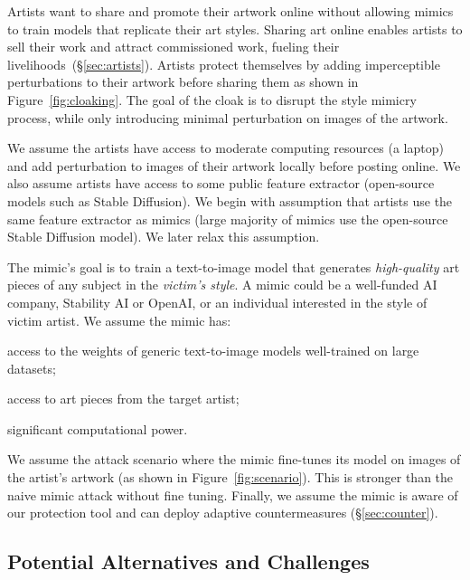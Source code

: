  Artists want to share and promote their artwork online
without allowing mimics to train models that replicate their art styles.
Sharing art online enables artists to sell their work and attract
commissioned work, fueling their livelihoods~(\S\ref{sec:artists}). Artists
protect themselves by adding imperceptible perturbations to their artwork
before sharing them as shown in Figure~\ref{fig:cloaking}. The goal of the
\system{} cloak is to disrupt the style mimicry process, while only
introducing minimal perturbation on images of the artwork.

We assume the artists have access to moderate computing resources (\eg a
laptop) and add perturbation to images of their artwork locally before
posting online. We also assume artists have access to some public feature
extractor (\eg open-source models such as Stable Diffusion). We begin with
assumption that artists use the same feature extractor as mimics (large
majority of mimics use the open-source Stable Diffusion model). We later
relax this assumption.

 The mimic's goal is to train a text-to-image model that
generates \emph{high-quality} art pieces of any subject in the \emph{victim's
  style}. A mimic could be a well-funded AI company, \eg Stability AI or
OpenAI, or an individual interested in the style of victim artist. We assume
the mimic has:

\vspace{-0.1cm}
\begin{packed_itemize}
\item access to the weights of generic text-to-image models well-trained on large datasets;
\item access to art pieces from the target artist;
\item significant computational power. 
\end{packed_itemize}

\vspace{-0.1cm}
We assume the attack scenario where the mimic 
fine-tunes its model on images of the artist's artwork (as shown in
Figure~\ref{fig:scenario}). This is stronger than the naive mimic attack
without fine tuning. 
Finally, we assume the mimic is aware of our
protection tool and can deploy adaptive countermeasures (\S\ref{sec:counter}).  

\secspace
\subsection{Potential Alternatives and Challenges}
\label{sec:challenge}

